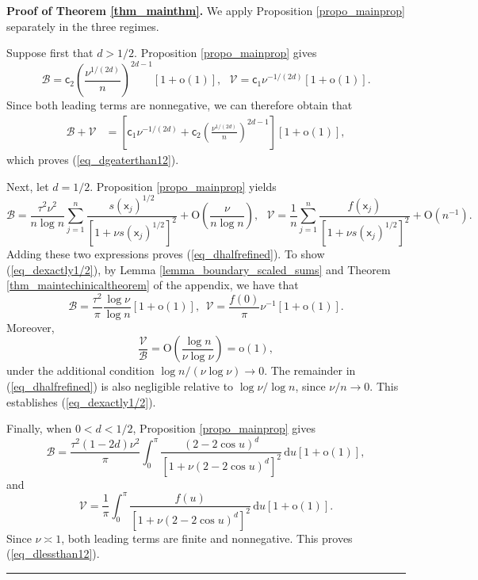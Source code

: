 \documentclass[11pt]{article}
\newcommand{\sfc}{\mathsf{c}}
\newcommand{\oo}{\mathrm{o}}
\newenvironment{proof}[1][Proof]{\noindent\textbf{#1.} }{\ \rule{0.5em}{0.5em}}
\numberwithin{equation}{section}
\numberwithin{figure}{section}
\begin{document}
\begin{proof}[Proof of Theorem \ref{thm_mainthm}]
We apply Proposition \ref{propo_mainprop} separately in the three
regimes.

Suppose first that \(d>1/2\). Proposition
\ref{propo_mainprop} gives
\[
\mathcal{B}
=
\mathsf{c}_2
\left(\frac{\nu^{1/(2d)}}{n}\right)^{2d-1}
[1+\mathrm{o}(1)], \ \ \
\mathcal{V}
=
\mathsf{c}_1\nu^{-1/(2d)}
[1+\mathrm{o}(1)].
\]
Since both leading terms are nonnegative, we can therefore obtain that 
\[
\begin{aligned}
\mathcal{B}+\mathcal{V}
&=
\left[
\mathsf{c}_1\nu^{-1/(2d)}
+
\mathsf{c}_2
\left(\frac{\nu^{1/(2d)}}{n}\right)^{2d-1}
\right]
[1+\mathrm{o}(1)],
\end{aligned}
\]
which proves (\ref{eq_dgeaterthan12}).

Next, let \(d=1/2\). Proposition
\ref{propo_mainprop} yields
\[
\mathcal{B}
=
\frac{\tau^2\nu^2}{n\log n}
\sum_{j=1}^n
\frac{s(\mathsf{x}_j)^{1/2}}
{[1+\nu s(\mathsf{x}_j)^{1/2}]^2}
+
\mathrm{O}\left(\frac{\nu}{n\log n}\right), \ \ \ 
\mathcal{V}
=
\frac{1}{n}
\sum_{j=1}^n
\frac{f(\mathsf{x}_j)}
{[1+\nu s(\mathsf{x}_j)^{1/2}]^2}
+
\mathrm{O}(n^{-1}).
\]
Adding these two expressions proves
(\ref{eq_dhalfrefined}). To show (\ref{eq_dexactly1/2}), by Lemma \ref{lemma_boundary_scaled_sums} and Theorem \ref{thm_maintechinicaltheorem}  of the appendix,  we have that
\[
\mathcal{B}
=
\frac{\tau^2}{\pi}
\frac{\log \nu}{\log n}
[1+\mathrm{o}(1)],
\ \
\mathcal{V}
=
\frac{f(0)}{\pi}\nu^{-1}[1+\mathrm{o}(1)].
\]
Moreover,
\[
\frac{\mathcal{V}}{\mathcal{B}}
=
\mathrm{O}\left(
\frac{\log n}{\nu\log \nu}
\right)
=
\mathrm{o}(1),
\]
under the additional condition
\(\log n/(\nu\log \nu)\to0\). The remainder in
(\ref{eq_dhalfrefined}) is also negligible relative to
\(\log \nu/\log n\), since \(\nu/n\to0\). This establishes (\ref{eq_dexactly1/2}).

Finally, when \(0<d<1/2\), Proposition
\ref{propo_mainprop} gives
\[
\mathcal{B}
=
\frac{\tau^2(1-2d)\nu^2}{\pi}
\int_0^\pi
\frac{(2-2\cos u)^d}
{[1+\nu(2-2\cos u)^d]^2}
\,\mathrm{d}u
[1+\mathrm{o}(1)],
\]
and
\[
\mathcal{V}
=
\frac{1}{\pi}
\int_0^\pi
\frac{f(u)}
{[1+\nu(2-2\cos u)^d]^2}
\,\mathrm{d}u
[1+\mathrm{o}(1)].
\]
Since \(\nu\asymp1\), both leading terms are finite and
nonnegative. This proves (\ref{eq_dlessthan12}).
%
\end{proof}
\end{document}

